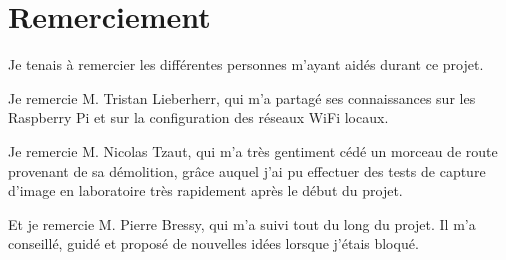 \section{Remerciement}
Je tenais à remercier les différentes personnes m'ayant aidés durant ce projet.

Je remercie M. Tristan Lieberherr, qui m'a partagé ses connaissances sur les Raspberry Pi et sur la configuration des réseaux WiFi locaux.

Je remercie M. Nicolas Tzaut, qui m'a très gentiment cédé un morceau de route provenant de sa démolition, grâce auquel j'ai pu effectuer
des tests de capture d'image en laboratoire très rapidement après le début du projet.

Et je remercie M. Pierre Bressy, qui m'a suivi tout du long du projet. Il m'a conseillé, guidé et proposé de nouvelles idées lorsque
j'étais bloqué.
\vfil
\hspace{8cm}\makeatletter\@author\makeatother\par
\hspace{8cm}\begin{minipage}{5cm}
    \printsignature
\end{minipage}
